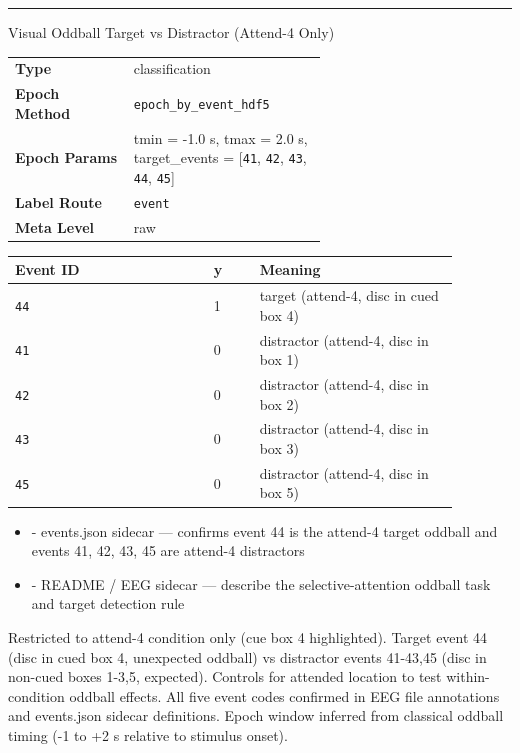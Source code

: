 {\begin{tcolorbox}
\noindent\rule{\linewidth}{0.4pt}\par\nopagebreak
{} {\footnotesize Visual Oddball Target vs Distractor (Attend-4 Only)}\par\smallskip
{\footnotesize\begin{tabular}{@{}lp{0.62\linewidth}@{}}
\textbf{Type} & classification \\
\textbf{Epoch Method} & \texttt{epoch\_by\_event\_hdf5} \\
\textbf{Epoch Params} & tmin = -1.0 s, tmax = 2.0 s, target\_events = [\texttt{41}, \texttt{42}, \texttt{43}, \texttt{44}, \texttt{45}] \\
\textbf{Label Route} & \texttt{event} \\
\textbf{Meta Level} & raw \\
\end{tabular}}
\par{}\par\smallskip
\begingroup\footnotesize
\begin{tabular}{@{}p{0.3911\linewidth}p{0.0978\linewidth}p{0.3911\linewidth}@{}}
\toprule
\textbf{Event ID} & \textbf{y} & \textbf{Meaning} \\
\midrule
\texttt{44} & 1 & target (attend-4, disc in cued box 4) \\
\texttt{41} & 0 & distractor (attend-4, disc in box 1) \\
\texttt{42} & 0 & distractor (attend-4, disc in box 2) \\
\texttt{43} & 0 & distractor (attend-4, disc in box 3) \\
\texttt{45} & 0 & distractor (attend-4, disc in box 5) \\
\bottomrule
\end{tabular}
\endgroup
\par{}\par
\begin{itemize}[leftmargin=1.3em,noitemsep,topsep=1pt]
\item[\scriptsize$\cdot$] {\scriptsize - events.json sidecar --- confirms event 44 is the attend-4 target oddball and events 41, 42, 43, 45 are attend-4 distractors}
\item[\scriptsize$\cdot$] {\scriptsize - README / EEG sidecar --- describe the selective-attention oddball task and target detection rule}
\end{itemize}
\par{} {\footnotesize Restricted to attend-4 condition only (cue box 4 highlighted). Target event 44 (disc in cued box 4, unexpected oddball) vs distractor events 41-43,45 (disc in non-cued boxes 1-3,5, expected). Controls for attended location to test within-condition oddball effects. All five event codes confirmed in EEG file annotations and events.json sidecar definitions. Epoch window inferred from classical oddball timing (-1 to +2 s relative to stimulus onset).}

\end{tcolorbox}}
